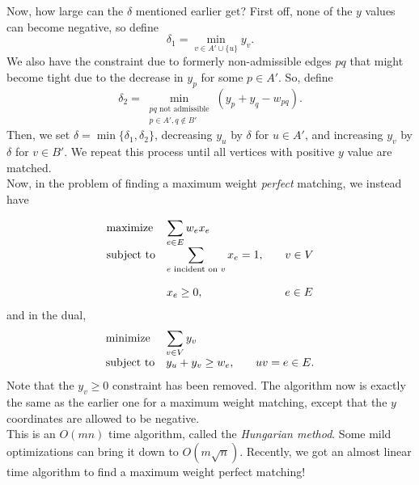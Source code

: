 	Now, how large can the $\delta$ mentioned earlier get? First off, none of the $y$ values can become negative, so define
	\[ \delta_1 = \min_{v \in A' \cup \{u\}} y_v. \]
	We also have the constraint due to formerly non-admissible edges $pq$ that might become tight due to the decrease in $y_p$ for some $p \in A'$. So, define
	\[ \delta_2 = \min_{\substack{pq \text{ not admissible} \\ p \in A', q \not\in B'}} (y_p + y_q - w_{pq}). \]
	Then, we set $\delta = \min\{\delta_1,\delta_2\}$, decreasing $y_u$ by $\delta$ for $u \in A'$, and increasing $y_v$ by $\delta$ for $v \in B'$. We repeat this process until all vertices with positive $y$ value are matched.\\

	Now, in the problem of finding a maximum weight \emph{perfect} matching, we instead have

	\[
	\begin{array}{ll@{}ll}
	\text{maximize}  & \displaystyle\sum_{e \in E} w_{e} x_{e} &\\
	\text{subject to}& \displaystyle\sum\limits_{e \text{ incident on } v} x_{e} = 1,  &\qquad v \in V\\\\
	                 & x_{e} \ge 0,                                                &\qquad e \in E
	\end{array}
	\]
	and in the dual,
	\[
	\begin{array}{ll@{}ll}
	\text{minimize}  & \displaystyle\sum_{v \in V} y_v &\\
	\text{subject to} \displaystyle &y_u+y_v \ge w_e,  &\qquad uv = e \in E.
	\end{array}
	\]
	Note that the $y_v \ge 0$ constraint has been removed. The algorithm now is exactly the same as the earlier one for a maximum weight matching, except that the $y$ coordinates are allowed to be negative.\\

	This is an $O(mn)$ time algorithm, called the \emph{Hungarian method}. Some mild optimizations can bring it down to $O(m\sqrt{n})$. Recently, we got an almost linear time algorithm to find a maximum weight perfect matching! %


